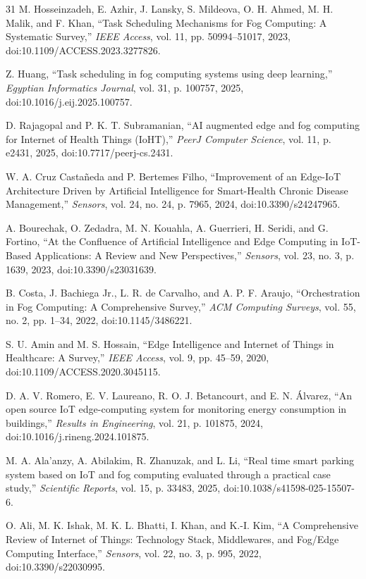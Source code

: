 \documentclass[conference]{IEEEtran}
\begin{document}
\begin{thebibliography}{31}
 M. Hosseinzadeh, E. Azhir, J. Lansky, S. Mildeova, O. H. Ahmed, M. H. Malik, and F. Khan, ``Task Scheduling Mechanisms for Fog Computing: A Systematic Survey,'' \emph{IEEE Access}, vol. 11, pp. 50994--51017, 2023, doi:10.1109/ACCESS.2023.3277826.

 Z. Huang, ``Task scheduling in fog computing systems using deep learning,'' \emph{Egyptian Informatics Journal}, vol. 31, p. 100757, 2025, doi:10.1016/j.eij.2025.100757.

 D. Rajagopal and P. K. T. Subramanian, ``AI augmented edge and fog computing for Internet of Health Things (IoHT),'' \emph{PeerJ Computer Science}, vol. 11, p. e2431, 2025, doi:10.7717/peerj-cs.2431.

 W. A. Cruz Casta\~neda and P. Bertemes Filho, ``Improvement of an Edge-IoT Architecture Driven by Artificial Intelligence for Smart-Health Chronic Disease Management,'' \emph{Sensors}, vol. 24, no. 24, p. 7965, 2024, doi:10.3390/s24247965.

 A. Bourechak, O. Zedadra, M. N. Kouahla, A. Guerrieri, H. Seridi, and G. Fortino, ``At the Confluence of Artificial Intelligence and Edge Computing in IoT-Based Applications: A Review and New Perspectives,'' \emph{Sensors}, vol. 23, no. 3, p. 1639, 2023, doi:10.3390/s23031639.

 B. Costa, J. Bachiega Jr., L. R. de Carvalho, and A. P. F. Araujo, ``Orchestration in Fog Computing: A Comprehensive Survey,'' \emph{ACM Computing Surveys}, vol. 55, no. 2, pp. 1--34, 2022, doi:10.1145/3486221.

 S. U. Amin and M. S. Hossain, ``Edge Intelligence and Internet of Things in Healthcare: A Survey,'' \emph{IEEE Access}, vol. 9, pp. 45--59, 2020, doi:10.1109/ACCESS.2020.3045115.

 D. A. V. Romero, E. V. Laureano, R. O. J. Betancourt, and E. N. \'Alvarez, ``An open source IoT edge-computing system for monitoring energy consumption in buildings,'' \emph{Results in Engineering}, vol. 21, p. 101875, 2024, doi:10.1016/j.rineng.2024.101875.

 M. A. Ala'anzy, A. Abilakim, R. Zhanuzak, and L. Li, ``Real time smart parking system based on IoT and fog computing evaluated through a practical case study,'' \emph{Scientific Reports}, vol. 15, p. 33483, 2025, doi:10.1038/s41598-025-15507-6.

 O. Ali, M. K. Ishak, M. K. L. Bhatti, I. Khan, and K.-I. Kim, ``A Comprehensive Review of Internet of Things: Technology Stack, Middlewares, and Fog/Edge Computing Interface,'' \emph{Sensors}, vol. 22, no. 3, p. 995, 2022, doi:10.3390/s22030995.


\end{thebibliography}
\end{document}
